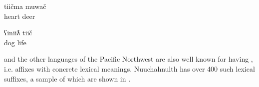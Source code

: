 \begin{exe}

  \ex\label{ex:3.4}

  \begin{xlist}

    \ex\label{ex:3.4a}
    \gll tiičma muwač\\
         heart  deer\\

    \ex\label{ex:3.4b}
    \gll ʕiniiƛ tiič\\
         dog    life\\

  \end{xlist}

\end{exe}

\noindent {} and the other languages of the Pacific Northwest are also well known for having , i.e. affixes with concrete lexical meanings. Nuuchahnulth has over 400 such lexical suffixes, a sample of which are shown in .

